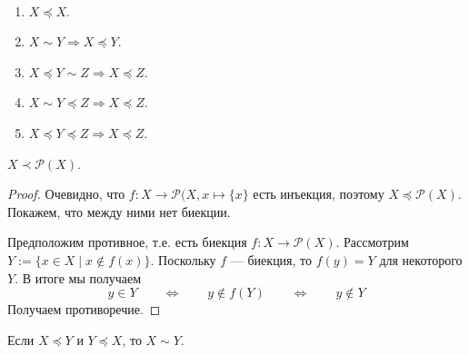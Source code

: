 \documentclass[12pt,a4paper]{article}
\newcommand{\Pcal}{\ensuremath{\mathcal{P}}\xspace}
\begin{document}
    \begin{theorem}\ 
        \begin{enumerate}
            \item $X \preccurlyeq X$.
            \item $X \sim Y \Rightarrow X \preccurlyeq Y$.
            \item $X \preccurlyeq Y \sim Z \Rightarrow X \preccurlyeq Z$.
            \item $X \sim Y \preccurlyeq Z \Rightarrow X \preccurlyeq Z$.
            \item $X \preccurlyeq Y \preccurlyeq Z \Rightarrow X \preccurlyeq Z$.
        \end{enumerate}
    \end{theorem}

    \begin{theorem}
        $X \prec \Pcal(X)$.
    \end{theorem}

    \begin{proof}
        Очевидно, что $f: X \to \Pcal(X, x \mapsto \{x\}$ есть инъекция, поэтому $X \preccurlyeq \Pcal(X)$. Покажем, что между ними нет биекции.

        Предположим противное, т.е. есть биекция $f: X \to \Pcal(X)$. Рассмотрим $Y := \{x \in X \mid x \notin f(x)\}$. Поскольку $f$ --- биекция, то $f(y) = Y$ для некоторого $Y$. В итоге мы получаем
        \[
            y \in Y \qquad
            \Longleftrightarrow \qquad
            y \notin f(Y) \qquad
            \Longleftrightarrow \qquad
            y \notin Y
        \]
        Получаем противоречие.
    \end{proof}

    \begin{theorem}
        Если $X \preccurlyeq Y$ и $Y \preccurlyeq X$, то $X \sim Y$.
    \end{theorem}
\end{document}
